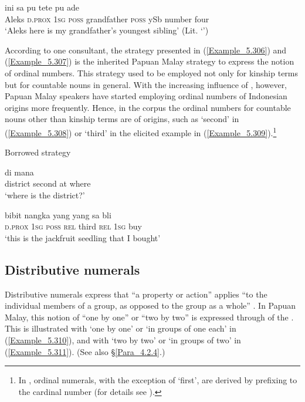 \ea
\label{Example_5.307}
 {ini} {sa} {pu} {tete} {pu} {ade} {} {}\\ %
 Aleks  \textsc{d.prox}  \textsc{1sg}  \textsc{poss}  grandfather  \textsc{poss}  ySb  number  four\\
\glt 
‘Aleks here is my grandfather’s  youngest sibling’ (Lit. ‘’) \textstyleExampleSource{[Elicited BR120821.002]}
\z


According to one consultant, the strategy presented in (\ref{Example_5.306}) and (\ref{Example_5.307}) is the inherited Papuan Malay strategy to express the notion of ordinal numbers. This strategy used to be employed not only for kinship terms but for countable nouns in general. With the increasing influence of , however, Papuan Malay speakers have started employing ordinal numbers of Indonesian origins more frequently. Hence, in the corpus the ordinal numbers for countable nouns other than kinship terms are of  origins, such as  ‘second’ in (\ref{Example_5.308}) or  ‘third’ in the elicited example in (\ref{Example_5.309}).\footnote{In , ordinal numerals, with the exception of  ‘first’, are derived by prefixing  to the cardinal number (for details see \citealt[293]{Mintz.1994}).}


\begin{styleExampleTitle}
Borrowed strategy
\end{styleExampleTitle}

\ea
\label{Example_5.308}
 {} {di} {mana}\\ %
 district  second  at  where\\
\glt 
‘where is the  district?’ \textstyleExampleSource{[081010-001-Cv.0071]}
\z

\ea
\label{Example_5.309}
 {bibit} {nangka} {yang} {} {yang} {sa} {bli}\\ %
 \textsc{d.prox}  \textsc{1sg}  \textsc{poss}  \textsc{rel}  third  \textsc{rel}  \textsc{1sg}  buy\\
\glt
‘this is the  jackfruit seedling that I bought’ \textstyleExampleSource{[Elicited BR120821.003]}
\z


\subsection{Distributive numerals}
\label{Para_5.9.3}
Distributive numerals express that “a property or action” applies “to the individual members of a group, as opposed to the group as a whole” {\citep[154]{Crystal.2008}}. In Papuan Malay, this notion of ``one by one'' or ``two by two'' is expressed through  of the . This is illustrated with  ‘one by one’ or ‘in groups of one each’ in (\ref{Example_5.310}), and with  ‘two by two’ or ‘in groups of two’ in (\ref{Example_5.311}). (See also §\ref{Para_4.2.4}.)



